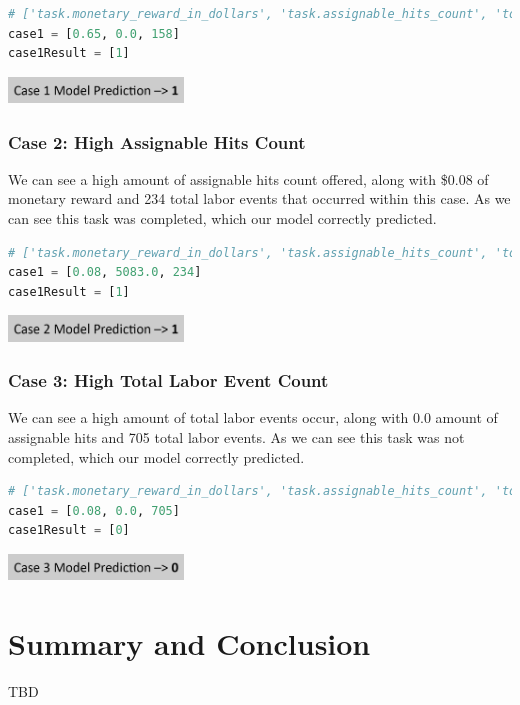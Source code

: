 \documentclass[11pt]{article}
\begin{document}
\begin{lstlisting}[language=Python, caption=Case 1 - Feature input and 'completed\_task' ouptut.]
# ['task.monetary_reward_in_dollars', 'task.assignable_hits_count', 'total.labor.event_count']
case1 = [0.65, 0.0, 158]
case1Result = [1]
\end{lstlisting}

\includegraphics[width=0.35\textwidth, center]{figures/case-1-model-prediction}

\subsubsection{Case 2: High Assignable Hits Count}
We can see a high amount of assignable hits count offered, along with \$0.08 of monetary reward and 234 total labor events that occurred within this case. As we can see this task was completed, which our model correctly predicted.

\begin{lstlisting}[language=Python, caption=Case 2 - Feature input and 'completed\_task' ouptut.]
# ['task.monetary_reward_in_dollars', 'task.assignable_hits_count', 'total.labor.event_count']
case1 = [0.08, 5083.0, 234]
case1Result = [1]
\end{lstlisting}

\includegraphics[width=0.35\textwidth, center]{figures/case-2-model-prediction}

\subsubsection{Case 3: High Total Labor Event Count}
We can see a high amount of total labor events occur, along with 0.0 amount of assignable hits and 705 total labor events. As we can see this task was not completed, which our model correctly predicted.

\begin{lstlisting}[language=Python, caption=Case 3 - Feature input and 'completed\_task' ouptut.]
# ['task.monetary_reward_in_dollars', 'task.assignable_hits_count', 'total.labor.event_count']
case1 = [0.08, 0.0, 705]
case1Result = [0]
\end{lstlisting}

\includegraphics[width=0.35\textwidth, center]{figures/case-3-model-prediction}

\pagebreak

\section{Summary and Conclusion}
TBD





\end{document}
